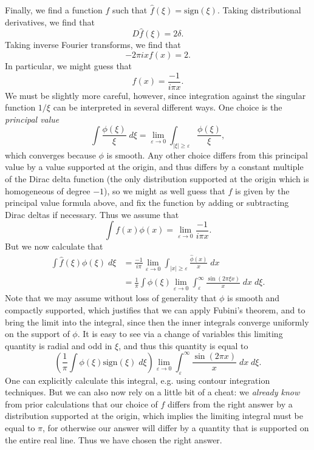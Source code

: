 \documentclass{exam}
\theoremstyle{problemstyle}
\newcommand{\1}[1]{\textbf{1}_{\left[#1\right]}} %
\begin{document}
\begin{questions}
\begin{solution}
    Finally, we find a function $f$ such that $\widehat{f}(\xi) = \text{sign}(\xi)$. Taking distributional derivatives, we find that
    \[ D \widehat{f}(\xi) = 2 \delta. \]
    Taking inverse Fourier transforms, we find that
    \[ - 2 \pi i x f(x) = 2. \]
    In particular, we might guess that
    \[ f(x) = \frac{-1}{i \pi x}. \]
    We must be slightly more careful, however, since integration against the singular function $1/\xi$ can be interpreted in several different ways. One choice is the \emph{principal value}
    \[ \int \frac{\phi(\xi)}{\xi}\; d\xi = \lim_{\varepsilon \to 0} \int_{|\xi| \geq \varepsilon} \frac{\phi(\xi)}{\xi}, \]
    which converges because $\phi$ is smooth. Any other choice differs from this principal value by a value supported at the origin, and thus differs by a constant multiple of the Dirac delta function (the only distribution supported at the origin which is homogeneous of degree $-1$), so we might as well guess that $f$ is given by the principal value formula above, and fix the function by adding or subtracting Dirac deltas if necessary. Thus we assume that
    \[ \int f(x) \phi(x) = \lim_{\varepsilon \to 0} \frac{-1}{i \pi x}. \]
    But we now calculate that
    \begin{align*}
    	\int \widehat{f}(\xi) \phi(\xi)\; d\xi &= \frac{-1}{i \pi} \lim_{\varepsilon \to 0} \int_{|x| \geq \varepsilon} \frac{\widehat{\phi}(x)}{x}\; dx\\
    	&= \frac{1}{\pi} \int \phi(\xi) \lim_{\varepsilon \to 0} \int_\varepsilon^\infty \frac{\sin(2 \pi \xi x)}{x}\; dx\; d\xi.
    \end{align*}
    Note that we may assume without loss of generality that $\phi$ is smooth and compactly supported, which justifies that we can apply Fubini's theorem, and to bring the limit into the integral, since then the inner integrals converge uniformly on the support of $\phi$. It is easy to see via a change of variables this limiting quantity is radial and odd in $\xi$, and thus this quantity is equal to
    \[ \left( \frac{1}{\pi} \int \phi(\xi) \text{sign}(\xi)\; d\xi \right) \lim_{\varepsilon \to 0} \int_\varepsilon^\infty \frac{\sin(2 \pi x)}{x}\; dx\; d\xi. \]
    One can explicitly calculate this integral, e.g. using contour integration techniques. But we can also now rely on a little bit of a cheat: we \emph{already know} from prior calculations that our choice of $f$ differs from the right answer by a distribution supported at the origin, which implies the limiting integral must be equal to $\pi$, for otherwise our answer will differ by a quantity that is supported on the entire real line. Thus we have chosen the right answer.


\end{solution}
\end{questions}
\end{document}
